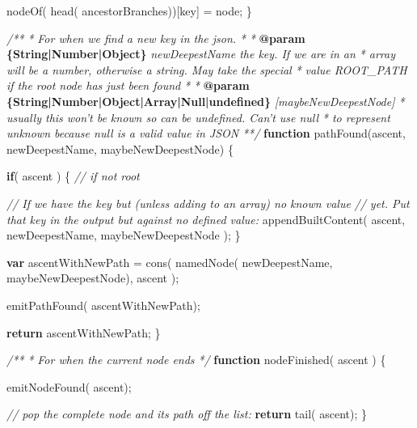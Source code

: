 \documentclass[12pt, ]{article}
\newenvironment{Shaded}{}{}
\newcommand{\KeywordTok}[1]{\textcolor[rgb]{0.00,0.44,0.13}{\textbf{{#1}}}}
\newcommand{\CommentTok}[1]{\textcolor[rgb]{0.38,0.63,0.69}{\textit{{#1}}}}
\newcommand{\FunctionTok}[1]{\textcolor[rgb]{0.02,0.16,0.49}{{#1}}}
\newcommand{\NormalTok}[1]{{#1}}
\begin{document}
\begin{Shaded}
\begin{Highlighting}[]
      \FunctionTok{nodeOf}\NormalTok{( }\FunctionTok{head}\NormalTok{( ancestorBranches))[key] = node;}
   \NormalTok{\}}

     
   \CommentTok{/**}
\CommentTok{    * For when we find a new key in the json.}
\CommentTok{    * }
\CommentTok{    * }\KeywordTok{@param}\CommentTok{ }\KeywordTok{\{String|Number|Object\}}\CommentTok{ newDeepestName the key. If we are in an }
\CommentTok{    *    array will be a number, otherwise a string. May take the special }
\CommentTok{    *    value ROOT_PATH if the root node has just been found}
\CommentTok{    *    }
\CommentTok{    * }\KeywordTok{@param}\CommentTok{ }\KeywordTok{\{String|Number|Object|Array|Null|undefined\}}\CommentTok{ [maybeNewDeepestNode] }
\CommentTok{    *    usually this won't be known so can be undefined. Can't use null }
\CommentTok{    *    to represent unknown because null is a valid value in JSON}
\CommentTok{    **/}  
   \KeywordTok{function} \FunctionTok{pathFound}\NormalTok{(ascent, newDeepestName, maybeNewDeepestNode) \{}

      \KeywordTok{if}\NormalTok{( ascent ) \{ }\CommentTok{// if not root}
      
         \CommentTok{// If we have the key but (unless adding to an array) no known value}
         \CommentTok{// yet. Put that key in the output but against no defined value:      }
         \FunctionTok{appendBuiltContent}\NormalTok{( ascent, newDeepestName, maybeNewDeepestNode );}
      \NormalTok{\}}
   
      \KeywordTok{var} \NormalTok{ascentWithNewPath = }\FunctionTok{cons}\NormalTok{( }
                                 \FunctionTok{namedNode}\NormalTok{( newDeepestName, }
                                            \NormalTok{maybeNewDeepestNode), }
                                 \NormalTok{ascent}
                              \NormalTok{);}

      \FunctionTok{emitPathFound}\NormalTok{( ascentWithNewPath);}
 
      \KeywordTok{return} \NormalTok{ascentWithNewPath;}
   \NormalTok{\}}


   \CommentTok{/**}
\CommentTok{    * For when the current node ends}
\CommentTok{    */}
   \KeywordTok{function} \FunctionTok{nodeFinished}\NormalTok{( ascent ) \{}

      \FunctionTok{emitNodeFound}\NormalTok{( ascent);}
                          
      \CommentTok{// pop the complete node and its path off the list:                                    }
      \KeywordTok{return} \FunctionTok{tail}\NormalTok{( ascent);}
   \NormalTok{\}      }
                 

\end{Highlighting}
\end{Shaded}
\end{document}
